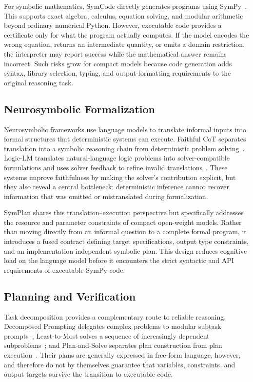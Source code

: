 \documentclass[conference,a4paper]{IEEEtran}
\begin{document}
For symbolic mathematics, SymCode directly generates programs using SymPy~\cite{nezhad2025symcode,meurer2017sympy}. This supports exact algebra, calculus, equation solving, and modular arithmetic beyond ordinary numerical Python. However, executable code provides a certificate only for what the program actually computes. If the model encodes the wrong equation, returns an intermediate quantity, or omits a domain restriction, the interpreter may report success while the mathematical answer remains incorrect. Such risks grow for compact models because code generation adds syntax, library selection, typing, and output-formatting requirements to the original reasoning task.

\subsection{Neurosymbolic Formalization}

Neurosymbolic frameworks use language models to translate informal inputs into formal structures that deterministic systems can execute. Faithful CoT separates translation into a symbolic reasoning chain from deterministic problem solving~\cite{lyu2023faithful}. Logic-LM translates natural-language logic problems into solver-compatible formulations and uses solver feedback to refine invalid translations~\cite{pan2023logiclm}. These systems improve faithfulness by making the solver's contribution explicit, but they also reveal a central bottleneck: deterministic inference cannot recover information that was omitted or mistranslated during formalization.

SymPlan shares this translation--execution perspective but specifically addresses the resource and parameter constraints of compact open-weight models. Rather than moving directly from an informal question to a complete formal program, it introduces a fused contract defining target specifications, output type constraints, and an implementation-independent symbolic plan. This design reduces cognitive load on the language model before it encounters the strict syntactic and API requirements of executable SymPy code.

\subsection{Planning and Verification}

Task decomposition provides a complementary route to reliable reasoning. Decomposed Prompting delegates complex problems to modular subtask prompts~\cite{khot2023decomposed}; Least-to-Most solves a sequence of increasingly dependent subproblems~\cite{zhou2023leasttomost}; and Plan-and-Solve separates plan construction from plan execution~\cite{wang2023plan}. Their plans are generally expressed in free-form language, however, and therefore do not by themselves guarantee that variables, constraints, and output targets survive the transition to executable code.
\end{document}
